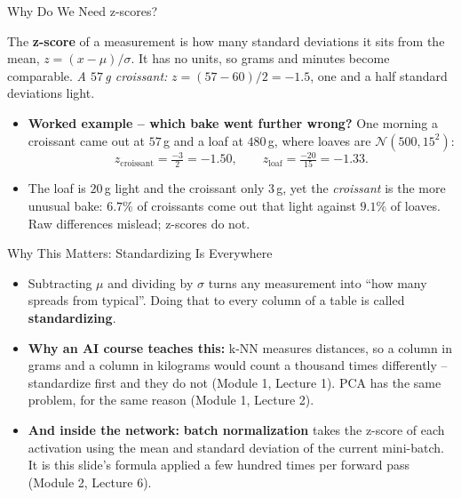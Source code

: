 \begin{frame}{Why Do We Need z-scores?}
\begin{rldefinition}
The \textbf{z-score} of a measurement is how many standard deviations it sits from the mean, $z = (x - \mu)/\sigma$. It has no units, so grams and minutes become comparable. \emph{A $57$\,g croissant:} $z = (57-60)/2 = -1.5$, one and a half standard deviations light.
\end{rldefinition}
\pause
\begin{itemize}
  \item \textbf{Worked example -- which bake went further wrong?} One morning a croissant came out at $57$\,g and a loaf at $480$\,g, where loaves are $\mathcal{N}(500, 15^2)$:
  \[
    z_{\text{croissant}} = \tfrac{-3}{2} = -1.50,
    \qquad
    z_{\text{loaf}} = \tfrac{-20}{15} = -1.33 .
  \]
  \pause
  \item The loaf is $20$\,g light and the croissant only $3$\,g, yet the \emph{croissant} is the more unusual bake: $6.7\%$ of croissants come out that light against $9.1\%$ of loaves. Raw differences mislead; z-scores do not.
\end{itemize}
\end{frame}

\begin{frame}{Why This Matters: Standardizing Is Everywhere}
\begin{itemize}
  \item Subtracting $\mu$ and dividing by $\sigma$ turns any measurement into ``how many spreads from typical''. Doing that to every column of a table is called \textbf{standardizing}.
  \pause
  \item \textbf{Why an AI course teaches this:} k-NN measures distances, so a column in grams and a column in kilograms would count a thousand times differently -- standardize first and they do not (Module 1, Lecture 1). PCA has the same problem, for the same reason (Module 1, Lecture 2).
  \pause
  \item \textbf{And inside the network:} \textbf{batch normalization} takes the z-score of each activation using the mean and standard deviation of the current mini-batch. It is this slide's formula applied a few hundred times per forward pass (Module 2, Lecture 6).
\end{itemize}
\end{frame}

